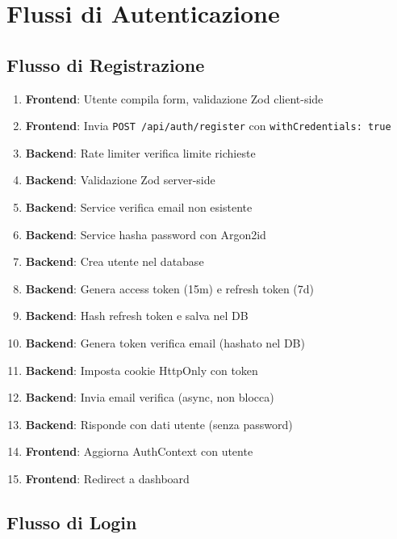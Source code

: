 \documentclass[11pt,a4paper]{article}
\newcommand{\code}[1]{\texttt{#1}}
\begin{document}
\section{Flussi di Autenticazione}

\subsection{Flusso di Registrazione}

\begin{enumerate}
    \item \textbf{Frontend}: Utente compila form, validazione Zod client-side
    \item \textbf{Frontend}: Invia \code{POST /api/auth/register} con \code{withCredentials: true}
    \item \textbf{Backend}: Rate limiter verifica limite richieste
    \item \textbf{Backend}: Validazione Zod server-side
    \item \textbf{Backend}: Service verifica email non esistente
    \item \textbf{Backend}: Service hasha password con Argon2id
    \item \textbf{Backend}: Crea utente nel database
    \item \textbf{Backend}: Genera access token (15m) e refresh token (7d)
    \item \textbf{Backend}: Hash refresh token e salva nel DB
    \item \textbf{Backend}: Genera token verifica email (hashato nel DB)
    \item \textbf{Backend}: Imposta cookie HttpOnly con token
    \item \textbf{Backend}: Invia email verifica (async, non blocca)
    \item \textbf{Backend}: Risponde con dati utente (senza password)
    \item \textbf{Frontend}: Aggiorna AuthContext con utente
    \item \textbf{Frontend}: Redirect a dashboard
\end{enumerate}

\subsection{Flusso di Login}
\end{document}
